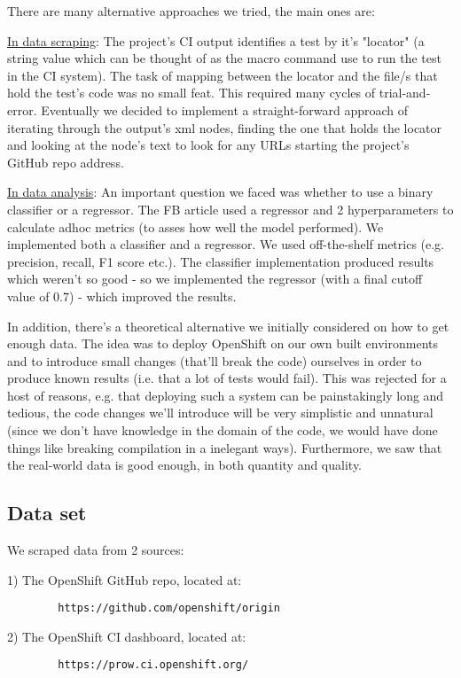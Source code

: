 \documentclass{article}
\begin{document}
There are many alternative approaches we tried, the main ones are:

\underline{In data scraping}: The project's CI output identifies a test by it's "locator" (a string value which can be thought of as the macro command use to run the test in the CI system). The task of mapping between the locator and the file/s that hold the test's code was no small feat. This required many cycles of trial-and-error. Eventually we decided to implement a straight-forward approach of iterating through the output's xml nodes, finding the one that holds the locator and looking at the node's text to look for any URLs starting the project's GitHub repo address.

\underline{In data analysis}: An important question we faced was whether to use a binary classifier or a regressor. The FB article used a regressor and 2 hyperparameters to calculate adhoc metrics (to asses how well the model performed). We implemented both a classifier and a regressor. We used off-the-shelf metrics (e.g. precision, recall, F1 score etc.). The classifier implementation produced results which weren't so good - so we implemented the regressor (with a final cutoff value of 0.7) - which improved the results.


In addition, there's a theoretical alternative we initially considered on how to get enough data. The idea was to deploy OpenShift on our own built environments and to introduce small  changes (that'll break the code) ourselves in order to produce known results (i.e. that a lot of tests would fail). This was rejected for a host of reasons, e.g. that deploying such a system can be painstakingly long and tedious, the code changes we'll introduce will be very simplistic and unnatural (since we don't have knowledge in the domain of the code, we would have done things like breaking compilation in a inelegant ways). Furthermore, we saw that the real-world data is good enough, in both quantity and quality.



\subsection{Data set}
We scraped data from 2 sources:

1) The OpenShift GitHub repo, located at: 
        \begin{verbatim}
        https://github.com/openshift/origin
        \end{verbatim}
2) The OpenShift CI dashboard, located at:
        \begin{verbatim}
        https://prow.ci.openshift.org/
        \end{verbatim}
\end{document}
